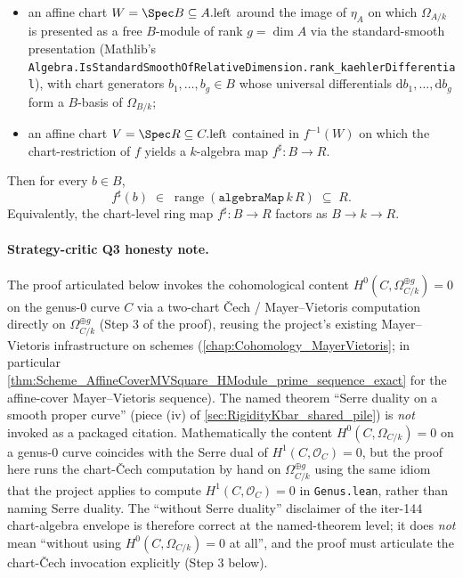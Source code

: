 \begin{theorem}
  \begin{itemize}
    \item an affine chart \(W = \Spec B \subseteq A.\mathrm{left}\) around the image of \(\eta_A\) on which \(\Omega_{A/k}\) is presented as a free \(B\)-module of rank \(g = \dim A\) via the standard-smooth presentation (Mathlib's \texttt{Algebra.IsStandardSmoothOfRelativeDimension.rank\_kaehlerDifferential}), with chart generators \(b_1, \ldots, b_g \in B\) whose universal differentials \(\mathrm d b_1, \ldots, \mathrm d b_g\) form a \(B\)-basis of \(\Omega_{B/k}\);
    \item an affine chart \(V = \Spec R \subseteq C.\mathrm{left}\) contained in \(f^{-1}(W)\) on which the chart-restriction of \(f\) yields a \(k\)-algebra map \(f^{\sharp} \colon B \to R\).
  \end{itemize}
  Then for every \(b \in B\),
  \[
    f^{\sharp}(b) \;\in\; \operatorname{range}(\mathtt{algebraMap}\,k\,R) \;\subseteq\; R.
  \]
  Equivalently, the chart-level ring map \(f^{\sharp} \colon B \to R\) factors as \(B \to k \to R\).

  \paragraph{Strategy-critic Q3 honesty note.} The proof articulated below invokes the cohomological content \(H^0(C, \Omega_{C/k}^{\oplus g}) = 0\) on the genus-\(0\) curve \(C\) via a two-chart \v Cech / Mayer--Vietoris computation directly on \(\Omega_{C/k}^{\oplus g}\) (Step 3 of the proof), reusing the project's existing Mayer--Vietoris infrastructure on schemes (\cref{chap:Cohomology_MayerVietoris}; in particular \cref{thm:Scheme_AffineCoverMVSquare_HModule_prime_sequence_exact} for the affine-cover Mayer--Vietoris sequence). The named theorem ``Serre duality on a smooth proper curve'' (piece (iv) of \cref{sec:RigidityKbar_shared_pile}) is \emph{not} invoked as a packaged citation. Mathematically the content \(H^0(C, \Omega_{C/k}) = 0\) on a genus-\(0\) curve coincides with the Serre dual of \(H^1(C, \mathcal O_C) = 0\), but the proof here runs the chart-\v Cech computation by hand on \(\Omega_{C/k}^{\oplus g}\) using the same idiom that the project applies to compute \(H^1(C, \mathcal O_C) = 0\) in \texttt{Genus.lean}, rather than naming Serre duality. The ``without Serre duality'' disclaimer of the iter-144 chart-algebra envelope is therefore correct at the named-theorem level; it does \emph{not} mean ``without using \(H^0(C, \Omega_{C/k}) = 0\) at all'', and the proof must articulate the chart-\v Cech invocation explicitly (Step 3 below).
\end{theorem}

